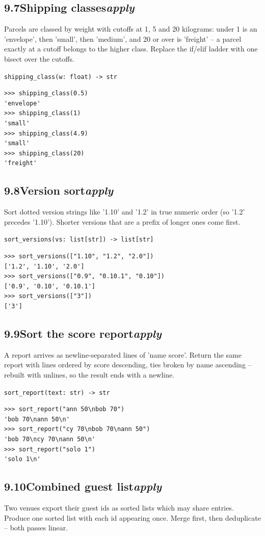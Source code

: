\documentclass[10pt,letterpaper]{book}
\begin{document}
\subsection*{9.7\quad Shipping classes\hfill\textnormal{\textit{apply}}}
Parcels are classed by weight with cutoffs at 1, 5 and 20 kilograms: under 1 is an 'envelope', then 'small', then 'medium', and 20 or over is 'freight' -- a parcel exactly at a cutoff belongs to the higher class. Replace the if/elif ladder with one bisect over the cutoffs.

\noindent\texttt{shipping\_class(w: float) -> str}
\begin{lstlisting}[style=ex]
>>> shipping_class(0.5)
'envelope'
>>> shipping_class(1)
'small'
>>> shipping_class(4.9)
'small'
>>> shipping_class(20)
'freight'
\end{lstlisting}
\subsection*{9.8\quad Version sort\hfill\textnormal{\textit{apply}}}
Sort dotted version strings like '1.10' and '1.2' in true numeric order (so '1.2' precedes '1.10'). Shorter versions that are a prefix of longer ones come first.

\noindent\texttt{sort\_versions(vs: list[str]) -> list[str]}
\begin{lstlisting}[style=ex]
>>> sort_versions(["1.10", "1.2", "2.0"])
['1.2', '1.10', '2.0']
>>> sort_versions(["0.9", "0.10.1", "0.10"])
['0.9', '0.10', '0.10.1']
>>> sort_versions(["3"])
['3']
\end{lstlisting}
\subsection*{9.9\quad Sort the score report\hfill\textnormal{\textit{apply}}}
A report arrives as newline-separated lines of 'name score'. Return the same report with lines ordered by score descending, ties broken by name ascending -- rebuilt with unlines, so the result ends with a newline.

\noindent\texttt{sort\_report(text: str) -> str}
\begin{lstlisting}[style=ex]
>>> sort_report("ann 50\nbob 70")
'bob 70\nann 50\n'
>>> sort_report("cy 70\nbob 70\nann 50")
'bob 70\ncy 70\nann 50\n'
>>> sort_report("solo 1")
'solo 1\n'
\end{lstlisting}
\subsection*{9.10\quad Combined guest list\hfill\textnormal{\textit{apply}}}
Two venues export their guest ids as sorted lists which may share entries. Produce one sorted list with each id appearing once. Merge first, then deduplicate -- both passes linear.
\end{document}
